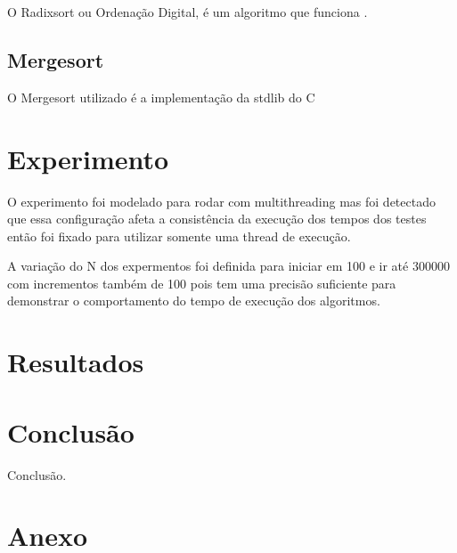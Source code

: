 \documentclass[12pt]{article}
\begin{document}
O Radixsort ou Ordenação Digital, é um algoritmo que funciona  \cite{radixsort:21}.

\subsection{Mergesort}

O Mergesort utilizado é a implementação da stdlib do C \cite{radixsort:21}

\section{Experimento}

O experimento foi modelado para rodar com multithreading mas foi detectado que essa configuração afeta a consistência da execução dos tempos dos testes então foi fixado para utilizar somente uma thread de execução.

A variação do N dos expermentos foi definida para iniciar em 100 e ir até 300000 com incrementos também de 100 pois tem uma precisão suficiente para demonstrar o comportamento do tempo de execução dos algoritmos.

\section{Resultados}

\section{Conclusão}

Conclusão.




\section*{Anexo}
\end{document}
